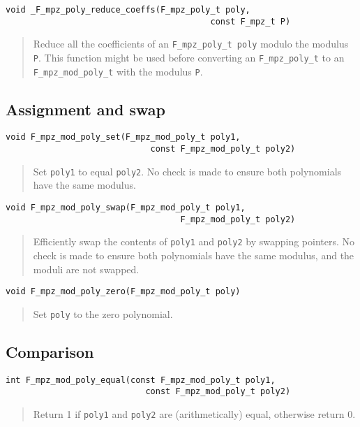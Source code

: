 \documentclass[a4paper,10pt]{article}
\newcommand{\code}{\lstinline}
\begin{document}
\begin{lstlisting}
void _F_mpz_poly_reduce_coeffs(F_mpz_poly_t poly, 
                                         const F_mpz_t P)
\end{lstlisting}
\begin{quote}
Reduce all the coefficients of an \code{F_mpz_poly_t poly} modulo the modulus \code{P}. This 
function might be used before converting an \code{F_mpz_poly_t} to an \code{F_mpz_mod_poly_t} with the
modulus \code{P}.
\end{quote}

\subsection{Assignment and swap}

\begin{lstlisting}
void F_mpz_mod_poly_set(F_mpz_mod_poly_t poly1, 
                             const F_mpz_mod_poly_t poly2)
\end{lstlisting}
\begin{quote}
Set \code{poly1} to equal \code{poly2}. No check is made to ensure both polynomials have the same modulus.
\end{quote}

\begin{lstlisting}
void F_mpz_mod_poly_swap(F_mpz_mod_poly_t poly1, 
                                   F_mpz_mod_poly_t poly2)
\end{lstlisting}
\begin{quote}
Efficiently swap the contents of \code{poly1} and \code{poly2} by swapping pointers. No check is made to
ensure both polynomials have the same modulus, and the moduli are not swapped.
\end{quote}

\begin{lstlisting}
void F_mpz_mod_poly_zero(F_mpz_mod_poly_t poly)
\end{lstlisting}
\begin{quote}
Set \code{poly} to the zero polynomial.
\end{quote}

\subsection{Comparison}

\begin{lstlisting}
int F_mpz_mod_poly_equal(const F_mpz_mod_poly_t poly1, 
                            const F_mpz_mod_poly_t poly2)
\end{lstlisting}
\begin{quote}
Return 1 if \code{poly1} and \code{poly2} are (arithmetically) equal, otherwise return 0.
\end{quote}
\end{document}
